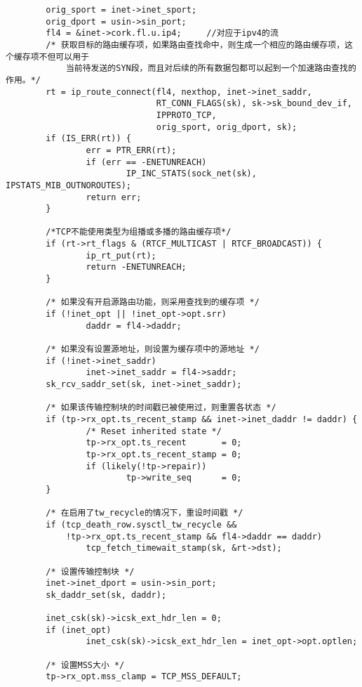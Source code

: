\begin{verbatim}
        orig_sport = inet->inet_sport;
        orig_dport = usin->sin_port;
        fl4 = &inet->cork.fl.u.ip4;		//对应于ipv4的流
        /* 获取目标的路由缓存项，如果路由查找命中，则生成一个相应的路由缓存项，这个缓存项不但可以用于
			当前待发送的SYN段，而且对后续的所有数据包都可以起到一个加速路由查找的作用。*/
        rt = ip_route_connect(fl4, nexthop, inet->inet_saddr,
                              RT_CONN_FLAGS(sk), sk->sk_bound_dev_if,
                              IPPROTO_TCP,
                              orig_sport, orig_dport, sk);
        if (IS_ERR(rt)) {
                err = PTR_ERR(rt);
                if (err == -ENETUNREACH)
                        IP_INC_STATS(sock_net(sk), IPSTATS_MIB_OUTNOROUTES);
                return err;
        }

		/*TCP不能使用类型为组播或多播的路由缓存项*/
        if (rt->rt_flags & (RTCF_MULTICAST | RTCF_BROADCAST)) {
                ip_rt_put(rt);
                return -ENETUNREACH;
        }

        /* 如果没有开启源路由功能，则采用查找到的缓存项 */
        if (!inet_opt || !inet_opt->opt.srr)
                daddr = fl4->daddr;

        /* 如果没有设置源地址，则设置为缓存项中的源地址 */
        if (!inet->inet_saddr)
                inet->inet_saddr = fl4->saddr;
        sk_rcv_saddr_set(sk, inet->inet_saddr);

        /* 如果该传输控制块的时间戳已被使用过，则重置各状态 */
        if (tp->rx_opt.ts_recent_stamp && inet->inet_daddr != daddr) {
                /* Reset inherited state */
                tp->rx_opt.ts_recent       = 0;
                tp->rx_opt.ts_recent_stamp = 0;
                if (likely(!tp->repair))
                        tp->write_seq      = 0;
        }

        /* 在启用了tw_recycle的情况下，重设时间戳 */
        if (tcp_death_row.sysctl_tw_recycle &&
            !tp->rx_opt.ts_recent_stamp && fl4->daddr == daddr)
                tcp_fetch_timewait_stamp(sk, &rt->dst);

        /* 设置传输控制块 */
        inet->inet_dport = usin->sin_port;
        sk_daddr_set(sk, daddr);

        inet_csk(sk)->icsk_ext_hdr_len = 0;
        if (inet_opt)
                inet_csk(sk)->icsk_ext_hdr_len = inet_opt->opt.optlen;

        /* 设置MSS大小 */
        tp->rx_opt.mss_clamp = TCP_MSS_DEFAULT;


\end{verbatim}
